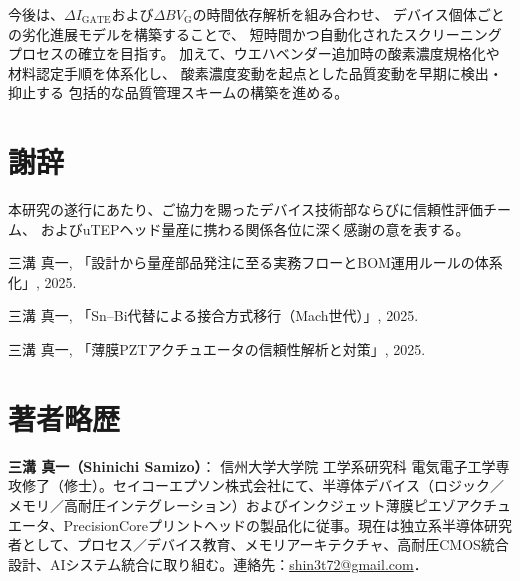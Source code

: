 \documentclass[twocolumn]{ieeetran}
\begin{document}
今後は、$\Delta I_\mathrm{GATE}$および$\Delta BV_\mathrm{G}$の時間依存解析を組み合わせ、
デバイス個体ごとの劣化進展モデルを構築することで、
短時間かつ自動化されたスクリーニングプロセスの確立を目指す。
加えて、ウエハベンダー追加時の酸素濃度規格化や材料認定手順を体系化し、
酸素濃度変動を起点とした品質変動を早期に検出・抑止する
包括的な品質管理スキームの構築を進める。

\section*{謝辞}
本研究の遂行にあたり、ご協力を賜ったデバイス技術部ならびに信頼性評価チーム、
およびuTEPヘッド量産に携わる関係各位に深く感謝の意を表する。

\begin{thebibliography}{99}

三溝 真一, 「設計から量産部品発注に至る実務フローとBOM運用ルールの体系化」, 2025.

三溝 真一, 「Sn–Bi代替による接合方式移行（Mach世代）」, 2025.

三溝 真一, 「薄膜PZTアクチュエータの信頼性解析と対策」, 2025.

\end{thebibliography}

\section*{著者略歴}
\noindent\textbf{三溝 真一（Shinichi Samizo）}：
信州大学大学院 工学系研究科 電気電子工学専攻修了（修士）。セイコーエプソン株式会社にて、半導体デバイス（ロジック／メモリ／高耐圧インテグレーション）およびインクジェット薄膜ピエゾアクチュエータ、PrecisionCoreプリントヘッドの製品化に従事。現在は独立系半導体研究者として、プロセス／デバイス教育、メモリアーキテクチャ、高耐圧CMOS統合設計、AIシステム統合に取り組む。連絡先：\href{mailto:shin3t72@gmail.com}{shin3t72@gmail.com}．
\end{document}
